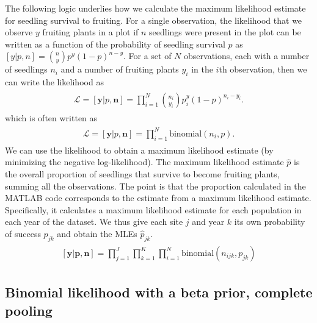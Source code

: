 \documentclass[12pt, oneside, titlepage]{article}   	%
\begin{document}
The following logic underlies how we calculate the maximum likelihood estimate for seedling survival to fruiting. For a single observation, the likelihood that we observe $y$ fruiting plants in a plot if $n$ seedlings were present in the plot can be written as a function of the probability of seedling survival $p$ as $[y|p,n] = \binom{n}{y}p^y(1-p)^{n-y}$. For a set of $N$ observations, each with a number of seedlings $n_i$ and a number of fruiting plants $y_i$ in the $i$th observation, then we can write the likelihood as
%
\begin{align}
  \begin{split}
\mathcal{L} = [\bm{y}|p,\bm{n}]  = \prod_{i=1}^N \binom{n_i}{y_i}p^y_i(1-p)^{n_i-y_i}.
  \end{split}
\end{align}
%
which is often written as
%
\begin{align}
  \begin{split}
\mathcal{L} = [\bm{y}|p,\bm{n}]  = \prod_{i=1}^N \mathrm{binomial}(n_i,p).
  \end{split}
\end{align}
We can use the likelihood to obtain a maximum likelihood estimate (by minimizing the negative log-likelihood). The maximum likelihood estimate $\hat{p}$ is the overall proportion of seedlings that survive to become fruiting plants, summing all the observations. The point is that the proportion calculated in the MATLAB code corresponds to the estimate from a maximum likelihood estimate. Specifically, it calculates a maximum likelihood estimate for each population in each year of the dataset. We thus give each site $j$ and year $k$ its own probability of success $p_{jk}$ and obtain the MLEs $\hat{p}_{jk}$.
%
\begin{align}
  \begin{split}
[\bm{y}|\bm{p},\bm{n}]  = \prod_{j=1}^J\prod_{k=1}^K\prod_{i=1}^N \mathrm{binomial}(n_{ijk},p_{jk}) \label{eq:frequentistMLE}
  \end{split}
\end{align}

\subsection*{Binomial likelihood with a beta prior, complete pooling}
\end{document}

